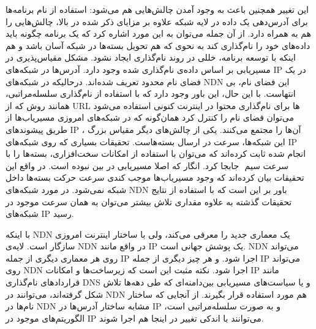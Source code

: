
این تغییر همچنین باعث به وجود آمدن چالش‌هایی هم می‌شود: 
 استفاده از نام برنامه‌‌ها برای آدرس‌دهی یک داده در لایه شبکه علاوه بر مزایای ذکر شده در بالا، چالش‌هایی را هم به همراه دارد. از آن جمله می‌توان به این مورد اشاره کرد که یک برنامه چگونه باید داده‌‌های خود را نام‌گذاری کند به نحوی که هم تحویل بسته‌ها در شبکه آسان باشد و هم اینکه با توسعه برنامه، خللی در روند نام‌گذاری ایجاد نشود. 
 مشکل مقیاس‌پذیری در مسیریابی بر اساس داده‌ی نام‌گذاری شده وجود دارد. آدرس‌ها در شبکه‌های IP در یک فضای نام محدود تعریف شده‌اند. درحالیکه در شبکه‌‌های NDN  این فضای نام، بی انتهاست. با این حال، این باور وجود دارد که با استفاده از نام‌گذاری سلسله‌مراتبی، همانند روش که از URL ها برای نام‌گذاری محتوا در اینترنت کنونی استفاده می‌شود می‌توان فضای نام را کنترل کرد همان‌گونه که در شبکه‌های امروزی مسیریاب‌ها از طریق پیشوندهای IP ، آن‌ها را مجتمع می‌کنند. 
 یکی از چالش‌های دیگر مقیاس بزرگ این شبکه‌ها، سرعت در ارسال بسته‌هاست. تحقیقات بسیاری که روی شبکه‌‌های IP انجام شده ثابت‌ کرده‌اند  که می‌توان با استفاده از امکانات سخت‌افزاری، بسته‌ها را با سرعت سیم ‌ جابجا کرد. انگار که اصلا مسیریابی در بین نبوده است. در واقع این تحقیقات بیان کرده‌اند که وجود مسیریاب‌ها موجب کندی سرعت حرکت بسته‌ها داخل شبکه  نمی‌شود. در مورد شبکه‌های NDN باور بر این است که با استفاده از نتایج تحقیقات گذشته به علاوه مقداری تلاش بیشتر می‌توان به همان سرعت موجود در شبکه‌های IP رسید. 

با اینکه NDN یک معماری جدید را معرفی می‌کند، ولی با ساختار اینترنت امروزی سازگار است. لایه‌ی NDN در واقع مانند IP یک پوشش جهانی است. NDN می‌تواند روی هر معماری دیگری از جمله IP  اجرا شود. و هر چیز دیگری از جمله IP می‌تواند روی NDN اجرا شود. نکته مثبت این است که زیرساخت‌ها و امکانات ‌IP مانند قرارداد‌های نام‌گذاری DNS و یا سیاست‌های مسیریابی بین‌دامنه‌ای
که طی دهه‌ها تلاش شکل گرفته‌اند، می‌توانند در NDN هم مورد استفاده قرار بگیرند. از آنجایی که ساختار نام‌‌ها در NDN مشابه ساختار آدرس‌ها در IP و به صورت سلسله‌مراتبی است، الگوریتم‌های موجود در IP می‌توانند با اندکی تغییر در اینجا هم اجرا شوند. 

